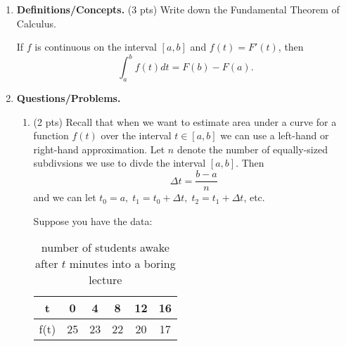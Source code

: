 \documentclass[11pt,letterpaper]{article}
\begin{document}
\begin{enumerate}
\item  \textbf{Definitions/Concepts.} (3 pts) Write down the Fundamental Theorem of Calculus.  

If $f$ is continuous on the interval $[a,b]$ and $f(t)=F'(t)$, then
\[\int_a^bf(t)dt=F(b)-F(a).\]

\vspace{1.5pc}

\item \textbf{Questions/Problems.} 
\begin{enumerate}
\item (2 pts) Recall that when we want to estimate area under a curve for a function $f(t)$ over the interval $t\in[a,b]$ we can use a left-hand or right-hand approximation.  Let $n$ denote the number of equally-sized subdivsions we use to divde the interval $[a,b]$.  Then
\[\Delta t=\frac{b-a}{n}\]
and we can let $t_0=a,\;t_1=t_0+\Delta t,\;t_2=t_1+\Delta t$, etc.   

Suppose you have the data:
\begin{table}[h]
\centering
\begin{tabular}{|c|c|c|c|c|c|}
\hline
t & 0 & 4 & 8 & 12 & 16 \\ [0.5ex]
\hline 
f(t) & 25 & 23 & 22 & 20 & 17 \\ [0.5ex]
\hline
\end{tabular}
\caption{number of students awake after $t$ minutes into a boring lecture}
\end{table}


\end{enumerate}
\end{enumerate}
\end{document}
